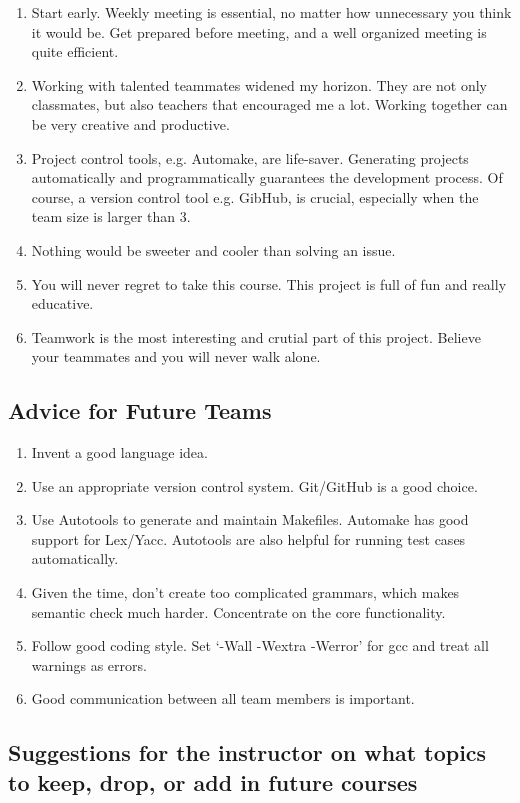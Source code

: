 \begin{enumerate}
\item
    	Start early. Weekly meeting is essential, no matter how unnecessary you think it would
		be. Get prepared before meeting, and a well organized meeting is quite efficient.
\item
	    Working with talented teammates widened my horizon. They are not only classmates, but
		also teachers that encouraged me a lot. Working together can be very creative and
		productive. 
\item
		Project control tools, e.g. Automake, are life-saver. Generating projects
		automatically and programmatically guarantees the development process. Of course, a
		version control tool e.g. GibHub, is crucial, especially when the team size is larger
		than 3.
\item
		Nothing would be sweeter and cooler than solving an issue. 
\item
		You will never regret to take this course. This project is full of fun and really
		educative.
\item
		Teamwork is the most interesting and crutial part of this project. Believe your teammates and you will never
		walk alone.
\end{enumerate}

\subsection{Advice for Future Teams}

\begin{enumerate}
\item
Invent a good language idea.
\item
Use an appropriate version control system. Git/GitHub is a good choice.
\item
Use Autotools to generate and maintain Makefiles. Automake has good support for
Lex/Yacc. Autotools are also helpful for running test cases automatically.
\item
Given the time, don’t create too complicated grammars, which makes semantic check
much harder. Concentrate on the core functionality.
\item
Follow good coding style. Set ‘-Wall -Wextra -Werror’ for gcc and treat all warnings
as errors.
\item
Good communication between all team members is important.
\end{enumerate}

\subsection{Suggestions for the instructor on what topics to keep, drop, or add in future
courses}

